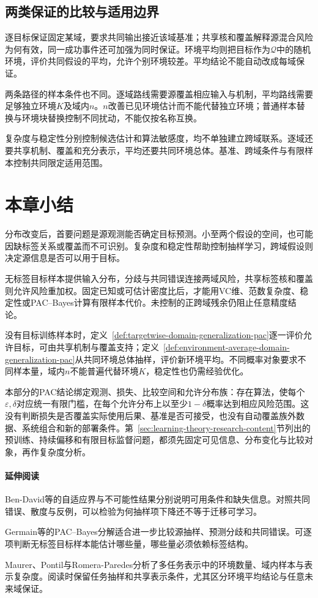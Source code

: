 \subsection{两类保证的比较与适用边界}
\label{sec:dg-guarantee-comparison}

逐目标保证固定某域，要求共同输出接近该域基准；共享核和覆盖解释源混合风险为何有效，同一成功事件还可加强为同时保证。环境平均则把目标作为$\mathcal Q$中的随机环境，评价共同假设的平均，允许个别环境较差。平均结论不能自动改成每域保证。

两条路径的样本条件也不同。逐域路线需要源覆盖相应输入与机制，平均路线需要足够独立环境$K$及域内$n$。$n$改善已见环境估计而不能代替独立环境；普通样本替换与环境块替换控制不同扰动，不能仅按名称互换。

复杂度与稳定性分别控制候选估计和算法敏感度，均不单独建立跨域联系。逐域还要共享机制、覆盖和充分表示，平均还要共同环境总体。基准、跨域条件与有限样本控制共同限定适用范围。

\section{本章小结}
\label{sec:transfer-learning-summary}

分布改变后，首要问题是源观测能否确定目标预测。小至两个假设的空间，也可能因缺标签关系或覆盖而不可识别。复杂度和稳定性帮助控制抽样学习，跨域假设则决定源信息是否可以用于目标。

无标签目标样本提供输入分布，分歧与共同错误连接两域风险，共享标签核和覆盖则允许风险重加权。固定已知或可估计密度比后，才能用VC维、范数复杂度、稳定性或PAC--Bayes计算有限样本代价。未控制的正跨域残余仍阻止任意精度结论。

没有目标训练样本时，定义~\ref{def:targetwise-domain-generalization-pac}逐一评价允许目标，可由共享机制与覆盖支持；定义~\ref{def:environment-average-domain-generalization-pac}从共同环境总体抽样，评价新环境平均。不同概率对象要求不同样本量，域内$n$不能普遍代替环境$K$，稳定性也仍需经验优化。

本部分的PAC结论绑定观测、损失、比较空间和允许分布族：存在算法，使每个$\varepsilon,\delta$对应统一有限门槛，在每个允许分布上以至少$1-\delta$概率达到相应风险范围。这没有判断损失是否覆盖实际使用后果、基准是否可接受，也没有自动覆盖族外数据、系统组合和新的部署条件。第~\ref{sec:learning-theory-research-content}节列出的预训练、持续偏移和有限目标监督问题，都须先固定可见信息、分布变化与比较对象，再作复杂度分析。

\paragraph{延伸阅读}
Ben-David等的自适应界与不可能性结果分别说明可用条件和缺失信息。对照共同错误、散度与反例，可以检验为何抽样项下降还不等于迁移可学习。

Germain等的PAC--Bayes分解适合进一步比较源抽样、预测分歧和共同错误。可逐项判断无标签目标样本能估计哪些量，哪些量必须依赖标签结构。

Maurer、Pontil与Romera-Paredes分析了多任务表示中的环境数量、域内样本与表示复杂度。阅读时保留任务抽样和共享表示条件，尤其区分环境平均结论与任意未来域保证。